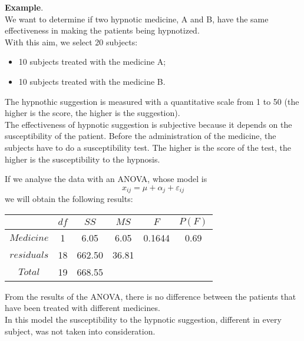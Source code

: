 \begin{frame}
  \vspace{.25cm}
  \textbf{Example}.\\
  We want to determine if two hypnotic medicine, A and B, have the same effectiveness in making the patients being hypnotized.\\
  With this aim, we select 20 subjects:
  \begin{itemize}
    \item 10 subjects treated with the medicine A;
    \item 10 subjects treated with the medicine B.
  \end{itemize}
  The hypnothic suggestion is measured with a quantitative scale from 1 to 50 (the higher is the score, the higher is the suggestion).\\
  The effectiveness of hypnotic suggestion is subjective because it depends on the susceptibility of the patient. Before the administration of the medicine, the subjects have to do a susceptibility test. The higher is the score of the test, the higher is the susceptibility to the hypnosis.
\end{frame}

\begin{frame}
  If we analyse the data with an ANOVA, whose model is
  \vspace{-0.2cm} $$ x_{ij} = \mu + \alpha_j + \varepsilon_{ij} $$
  we will obtain the following results:\\
  \vspace{0.3cm}
  \begin{center}
    \begin{tabular}{|c|c|c|c|c|c|}
      \hline
                  & $df$ & $SS$   & $MS$  & $F$    & $P(F)$  \\ \hline
      $Medicine$   & 1    & 6.05   & 6.05  & 0.1644 & 0.69    \\ \hline
      $residuals$ & 18   & 662.50 & 36.81 &        &         \\ \hline
      $Total$    & 19   & 668.55 &       &        &         \\ \hline
    \end{tabular}   
  \end{center}
  From the results of the ANOVA, there is no difference between the patients that have been treated with different medicines.\\
  In this model the susceptibility to the hypnotic suggestion, different in every subject, was not taken into consideration.
\end{frame}

